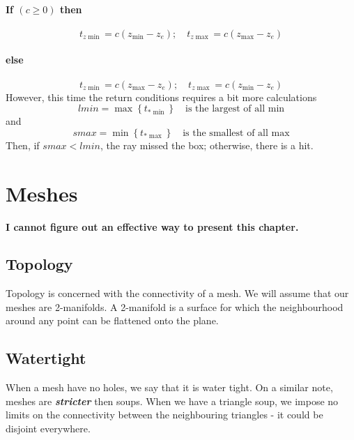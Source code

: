 \documentclass[11pt]{article}
\begin{document}
\paragraph{If $(c \geq 0)$ then}
\begin{equation}
	t_{z\min} = c(z_{\min} - z_e); \quad t_{z\max} = c(z_{\max} - z_e)
\end{equation}
\vspace{-3em}
\paragraph{else}
\begin{equation}
	t_{z\min} = c(z_{\max} - z_e); \quad t_{z\max} = c(z_{\min} - z_e)
\end{equation}
However, this time the return conditions requires a bit more calculations
\begin{equation}
	lmin = \max\left\{ t_{\ast\min} \right\} \quad \text{is the largest of all min}
\end{equation}
and 
\begin{equation}
	smax = \min\left\{ t_{\ast\max} \right\} \quad \text{is the smallest of all max}
\end{equation}
Then, if $smax < lmin$, the ray missed the box; otherwise, there is a hit. 


\section{Meshes}
\color{red}\textbf{I cannot figure out an effective way to present this chapter.} \color{black}
\subsection{Topology}
Topology is concerned with the connectivity of a mesh. We will assume that our meshes are 2-manifolds. A 2-manifold is a surface for which the neighbourhood around any point can be flattened onto the plane. 

\subsection{Watertight}
When a mesh have no holes, we say that it is water tight. On a similar note, meshes are \textit{\textbf{stricter}} then soups. When we have a triangle soup, we impose no limits on the connectivity between the neighbouring triangles - it could be disjoint everywhere.
\end{document}
